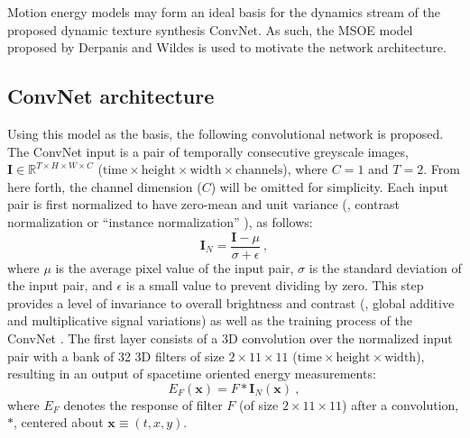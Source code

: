 Motion energy models may form an ideal basis for the dynamics stream of the proposed dynamic texture synthesis ConvNet. As such, the MSOE model proposed by Derpanis and Wildes \cite{derpanis2012spacetime} is used to motivate the network architecture.

\subsection{ConvNet architecture}

Using this model as the basis, the following convolutional 
network is proposed.
The ConvNet input is a pair of temporally consecutive greyscale images, $\mathbf{I} \in \mathbb{R}^{T \times H \times W \times C}$ ($\text{time} \times \text{height} \times \text{width} \times \text{channels}$), where $C=1$ and $T=2$. From here forth, the channel dimension ($C$) will be omitted for simplicity.
Each input pair is first normalized to have zero-mean and unit
variance (\ie, contrast normalization or ``instance normalization'' \cite{ulyanov2017}), as follows:
\begin{equation}
	\mathbf{I}_N = \frac{\mathbf{I} - \mu}{\sigma + \epsilon}\ ,
\end{equation}
where $\mu$ is the average pixel value of the input pair, $\sigma$ is the standard deviation of the input pair, and $\epsilon$ is a small value  to prevent dividing by zero.
This step provides a level of invariance to overall brightness and contrast (\ie, global additive and
multiplicative signal variations) as well as  the training process of the ConvNet . 
The first layer consists of a 3D convolution over the normalized input pair with a bank of 32 3D filters of size $2 \times 11 \times 11$
($\text{time} \times \text{height} \times \text{width}$), resulting in an output of spacetime oriented energy measurements:
\begin{equation}
	E_F(\mathbf{x}) = F * \mathbf{I}_N(\mathbf{x})\ ,
\end{equation}
where $E_F$ denotes the response of filter $F$ (of size $2 \times 11 \times 11$) after a convolution, $*$, centered about $\mathbf{x} \equiv (t, x, y)$.
